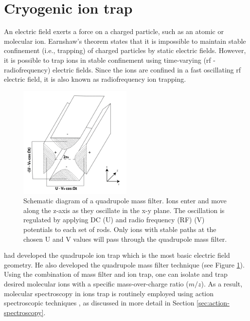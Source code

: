 \section{Cryogenic ion trap}

An electric field exerts a force on a charged particle, such as an atomic or molecular ion. Earnshaw's \cite{earnshaw_nature_1848} theorem states that it is impossible to maintain stable confinement (i.e., trapping) of charged particles by static electric fields. However, it is possible to trap ions in stable confinement using time-varying (rf - radiofrequency) electric fields. Since the ions are confined in a fast oscillating rf electric field, it is also known as radiofrequency ion trapping.

\begin{figure}[!htb]
    \centering
    \includegraphics[width=0.5\textwidth]{figures/intro/trap/Quadrupole.png}
    \caption{Schematic diagram of a quadrupole mass filter. Ions enter and move along the z-axis as they oscillate in the x-y plane. The oscillation is regulated by applying DC (U) and radio frequency (RF) (V) potentials to each set of rods. Only ions with stable paths at the chosen U and V values will pass through the quadrupole mass filter.}
    \label{fig:quadrupole}
\end{figure}

\citet{paul_ionenka_1955} had developed the quadrupole ion trap which is the most basic electric field geometry. He also developed the quadrupole mass filter technique \cite{paul_elektrische_1955} (see Figure \ref{fig:quadrupole}). Using the combination of mass filter and ion trap, one can isolate and trap desired molecular ions with a specific mass-over-charge ratio ($m/z$). As a result, molecular spectroscopy in ions trap is routinely employed using action spectroscopic techniques \cite{SA2019, Roithovareview, Asvany2021}, as discussed in more detail in Section \ref{sec:action-spectroscopy}.

